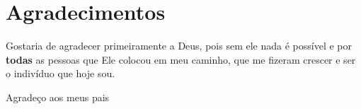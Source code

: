 \message{ !name(../main.tex)}\documentclass[grad,numbers]{coppe} %
\begin{document}
\dedication{``Se enxerguei mais longe, foi porque me apoiei sobre os
  ombros de gigantes.'' (Isaac Newton)}

\chapter*{Agradecimentos}

Gostaria de agradecer primeiramente a Deus, pois sem ele nada é
possível e por \textbf{todas} as pessoas que Ele colocou em meu caminho, que me
fizeram crescer e ser o indivíduo que hoje sou.


Agradeço aos meus pais


\end{document}
